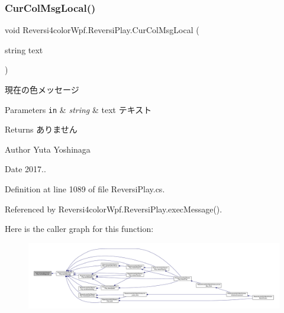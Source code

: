 \subsubsection{\texorpdfstring{Cur\+Col\+Msg\+Local()}{CurColMsgLocal()}}
{\footnotesize\ttfamily void Reversi4color\+Wpf.\+Reversi\+Play.\+Cur\+Col\+Msg\+Local (\begin{DoxyParamCaption}\item[{string}]{text }\end{DoxyParamCaption})\hspace{0.3cm}{\ttfamily [private]}}



現在の色メッセージ 


\begin{DoxyParams}[1]{Parameters}
\mbox{\tt in}  & {\em string} & text テキスト \\
\hline
\end{DoxyParams}
\begin{DoxyReturn}{Returns}
ありません 
\end{DoxyReturn}
\begin{DoxyAuthor}{Author}
Yuta Yoshinaga 
\end{DoxyAuthor}
\begin{DoxyDate}{Date}
2017.. 
\end{DoxyDate}


Definition at line 1089 of file Reversi\+Play.\+cs.



Referenced by Reversi4color\+Wpf.\+Reversi\+Play.\+exec\+Message().

Here is the caller graph for this function\+:
\nopagebreak
\begin{figure}[H]
\begin{center}
\leavevmode
\includegraphics[width=350pt]{class_reversi4color_wpf_1_1_reversi_play_ab28025c8262b1f7fb97de3b7796a2650_icgraph}
\end{center}
\end{figure}
\mbox{\label{class_reversi4color_wpf_1_1_reversi_play_ac370dc8e96852754f9c4846a3d2a49c6}} 

